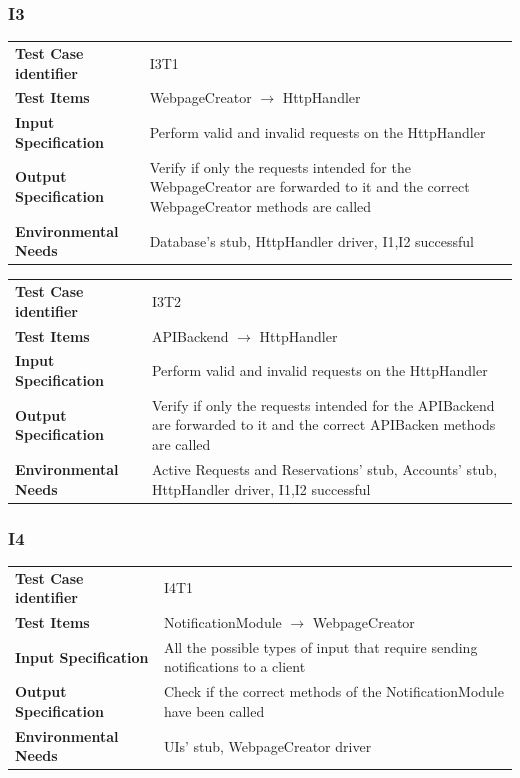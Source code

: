 \documentclass{article}
\begin{document}
\subsubsection{I3}
\begin{adjustbox}{width=1.2\textwidth}	
	\begin{tabular}{*{2}{p{}}}
		\toprule
		\textbf{Test Case identifier} & I3T1\\
		\textbf{Test Items} & WebpageCreator $\rightarrow$ HttpHandler\\
		\textbf{Input Specification} & Perform valid and invalid requests on the HttpHandler\\
		\textbf{Output Specification} & Verify if only the requests intended for 
		the WebpageCreator are forwarded to it and the correct WebpageCreator methods are called\\
		\textbf{Environmental Needs} & Database's stub, HttpHandler driver, I1,I2 successful\\
		\bottomrule
	\end{tabular}
\end{adjustbox}
\begin{adjustbox}{width=1.2\textwidth}	
	\begin{tabular}{*{2}{p{}}}
		\toprule
		\textbf{Test Case identifier} & I3T2\\
		\textbf{Test Items} & APIBackend $\rightarrow$ HttpHandler\\
		\textbf{Input Specification} & Perform valid and invalid requests on the HttpHandler\\
		\textbf{Output Specification} & Verify if only the requests intended for
		the APIBackend are forwarded to it and the correct APIBacken methods are called\\
		\textbf{Environmental Needs} & Active Requests and Reservations' stub, Accounts' stub, HttpHandler driver, I1,I2 successful\\
		\bottomrule
	\end{tabular}
\end{adjustbox}
\subsubsection{I4}
\begin{adjustbox}{width=1.2\textwidth}	
	\begin{tabular}{*{2}{p{}}}
		\toprule
		\textbf{Test Case identifier} & I4T1\\
		\textbf{Test Items} & NotificationModule $\rightarrow$ WebpageCreator\\
		\textbf{Input Specification} & All the possible types of input that require sending notifications to a client \\ 
		\textbf{Output Specification} & Check if the correct methods of the NotificationModule have been called\\
		\textbf{Environmental Needs} & UIs' stub, WebpageCreator driver\\
		\bottomrule
	\end{tabular}
\end{adjustbox}
\end{document}
